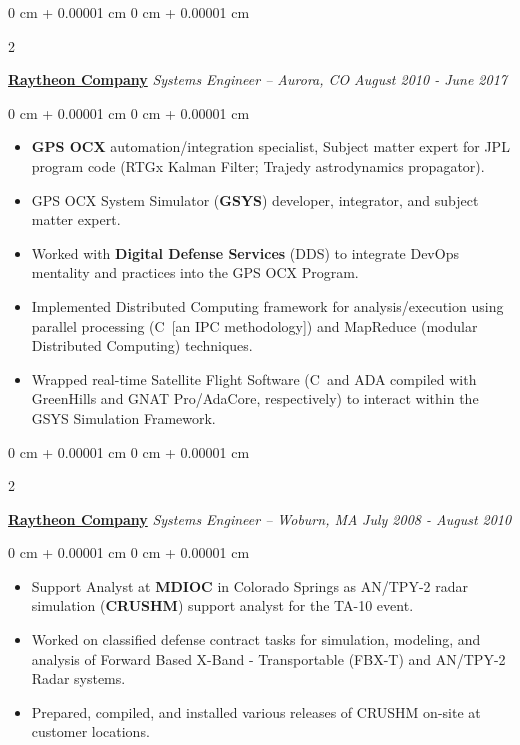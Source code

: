 \documentclass[10pt, letterpaper]{article}
\def\CC{{C\nolinebreak[4]\hspace{-.05em}\raisebox{.4ex}{\tiny\bf ++}}}
\newenvironment{highlights}{
    \begin{itemize}[
        topsep=0.10 cm,
        parsep=0.10 cm,
        partopsep=0pt,
        itemsep=0pt,
        leftmargin=0 cm + 10pt
    ]
}{
    \end{itemize}
} %
\newenvironment{onecolentry}{
    \begin{adjustwidth}{
        0 cm + 0.00001 cm
    }{
        0 cm + 0.00001 cm
    }
}{
    \end{adjustwidth}
} %
\newenvironment{twocolentry}[2][]{
    \onecolentry
    \def\secondColumn{#2}
    \setcolumnwidth{\fill, 4.5 cm}
    \begin{paracol}{2}
}{
    \switchcolumn \raggedleft \secondColumn
    \end{paracol}
    \endonecolentry
} %
\begin{document}
        \vspace{0.3 cm}

        \begin{twocolentry}{
            \textit{\small August 2010 - June 2017}
        }
            \href{http://www.raytheon.com/}{\textbf{\large Raytheon Company}} \textit{\small Systems Engineer -- Aurora, CO}\end{twocolentry}

        \vspace{0.10 cm}
        \begin{onecolentry}
            \begin{highlights}
                \item \textbf{GPS OCX} automation/integration specialist, Subject matter expert for JPL program code (RTGx Kalman Filter; Trajedy astrodynamics propagator).
                \item GPS OCX System Simulator (\textbf{GSYS}) developer, integrator, and subject matter expert.
                \item Worked with \textbf{Digital Defense Services} (DDS) to integrate DevOps mentality and practices into the GPS OCX Program.
                \item Implemented Distributed Computing framework for analysis/execution using parallel processing (\CC\ [an IPC methodology]) and MapReduce (modular Distributed Computing) techniques.
                \item Wrapped real-time Satellite Flight Software (\CC\ and ADA compiled with GreenHills and GNAT Pro/AdaCore, respectively) to interact within the GSYS Simulation Framework.
            \end{highlights}
        \end{onecolentry}

        \vspace{0.3 cm}

        \begin{twocolentry}{
            \textit{\small July 2008 - August 2010}
        }
            \href{http://www.raytheon.com/}{\textbf{\large Raytheon Company}} \textit{\small Systems Engineer -- Woburn, MA}\end{twocolentry}

        \vspace{0.10 cm}
        \begin{onecolentry}
            \begin{highlights}
                \item Support Analyst at \textbf{MDIOC} in Colorado Springs as AN/TPY-2 radar simulation (\textbf{CRUSHM}) support analyst for the TA-10 event.
                \item Worked on classified defense contract tasks for simulation, modeling, and analysis of Forward Based X-Band - Transportable (FBX-T) and AN/TPY-2 Radar systems.
                \item Prepared, compiled, and installed various releases of CRUSHM on-site at customer locations.
            \end{highlights}
        \end{onecolentry}
\end{document}
